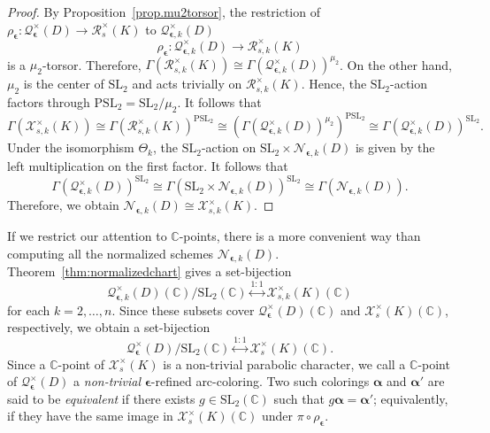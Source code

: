 \documentclass[12pt,reqno]{amsart}
\newcommand{\BC}{\mathbb{C}}
\newcommand{\calN}{\mathcal{N}}
\newcommand{\calQ}{\mathcal{Q}}
\newcommand{\calX}{\mathcal{X}}
\newcommand{\calR}{\mathcal{R}}
\newcommand{\SL}{\mathrm{SL}}
\newcommand{\PSL}{\mathrm{PSL}}
\theoremstyle{definition}
\begin{document}
\begin{proof}
		By Proposition~\ref{prop.mu2torsor}, the restriction of $\rho_{\boldsymbol{\epsilon}}: \calQ^\times_{\boldsymbol{\epsilon}}(D) \rightarrow \calR^\times_{s}(K)$ to $\calQ^\times_{{\boldsymbol{\epsilon}},k}(D)$
		$$
		\rho_{\boldsymbol{\epsilon}}: 	\calQ^\times_{{\boldsymbol{\epsilon}},k}(D)\longrightarrow	\calR^\times_{s,k}(K)
		$$
		is a $\mu_2$-torsor. Therefore,
		$\Gamma (\calR^\times_{s,k}(K)) \cong \Gamma (\calQ^\times_{{\boldsymbol{\epsilon}},k}(D))^{\mu_2}$.
		On the other hand,  $\mu_2$ is the center of $\SL_2$ and acts trivially on
		$\calR^\times_{s,k}(K)$. Hence, the $\SL_2$-action factors through
		$\PSL_2=\SL_2/\mu_2$. It follows that
		\[
		\Gamma (\calX_{s,k}^\times(K)) \cong
		\Gamma (\calR^\times_{s,k}(K))^{\PSL_2}	\cong 
        (\Gamma (\calQ^\times_{{\boldsymbol{\epsilon}},k}(D))^{\mu_2})^{\PSL_2} \cong 
        \Gamma (\calQ^\times_{{\boldsymbol{\epsilon}},k}(D))^{\SL_2}.
		\]
		Under the isomorphism $\Theta_k$, the $\SL_2$-action on $\SL_2 \times\calN_{\boldsymbol{\epsilon},k}(D)$ is given by the left multiplication on the first factor. It follows that
		$$
		\Gamma (\calQ^\times_{{\boldsymbol{\epsilon}},k}(D))^{\SL_2} \cong
        \Gamma(\SL_2 \times\calN_{\boldsymbol{\epsilon},k}(D))^{\SL_2} \cong
		\Gamma (\calN_{\boldsymbol{\epsilon},k}(D)).
		$$
		Therefore, we obtain $\calN_{\boldsymbol{\epsilon},k}(D) \cong \calX_{s,k}^\times(K)$.
	\end{proof}
    
    If we restrict our attention to $\BC$-points, there is a more convenient way than computing all the normalized schemes $\calN_{\boldsymbol{\epsilon},k}(D)$. Theorem~\ref{thm:normalizedchart} gives a set-bijection
    $$
    \calQ^\times_{{\boldsymbol{\epsilon},k}}(D)(\BC)/ \SL_2(\BC) \overset{1:1}{\longleftrightarrow} \calX^\times_{s,k}(K)(\BC)
    $$
    for each $k=2,\ldots,n$. Since these subsets cover $\calQ^\times_{{\boldsymbol{\epsilon}}}(D)(\BC)$ and $\calX^\times_{s}(K)(\BC)$, respectively, we obtain a set-bijection
    $$
    \calQ^\times_{{\boldsymbol{\epsilon}}}(D)/ \SL_2(\BC) \overset{1:1}{\longleftrightarrow}  \calX^\times_{s}(K)(\BC).
    $$
    Since a $\BC$-point of $\calX^\times_{s}(K)$ is a non-trivial parabolic character, we call a $\BC$-point of $\calQ^\times_{\boldsymbol{\epsilon}}(D)$ a \emph{non-trivial} $\boldsymbol{\epsilon}$-refined arc-coloring. Two such colorings $\boldsymbol{\alpha}$ and $\boldsymbol{\alpha}'$ are said to be \emph{equivalent} if there exists $g\in\SL_2(\BC)$ such that $g\boldsymbol{\alpha}=\boldsymbol{\alpha}'$; equivalently, if they have the same image in $\calX^\times_{s}(K)(\BC)$ under $\pi\circ\rho_{\boldsymbol{\epsilon}}$.
\end{document}

